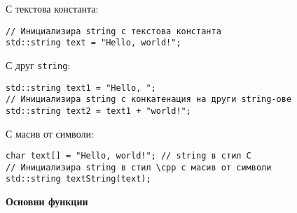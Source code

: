 \documentclass[oneside]{book}
\newcommand*{\code}[1]{\texttt{#1}}
\newcommand*{\cpp}{\texttt{C++}\ }
\begin{document}
С текстова константа:
\vspace{-4pt}\begin{mdframed}\begin{lstlisting}
// Инициализира string с текстова константа
std::string text = "Hello, world!";
\end{lstlisting}\end{mdframed}

С друг \code{string}:
\vspace{-4pt}\begin{mdframed}\begin{lstlisting}
std::string text1 = "Hello, ";
// Инициализира string с конкатенация на други string-ове
std::string text2 = text1 + "world!";
\end{lstlisting}\end{mdframed}

С масив от символи:
\vspace{-4pt}\begin{mdframed}\begin{lstlisting}
char text[] = "Hello, world!"; // string в стил C
// Инициализира string в стил \cpp с масив от символи
std::string textString(text);
\end{lstlisting}\end{mdframed}

\begin{center}\textbf{Основни функции}\end{center}
\end{document}
